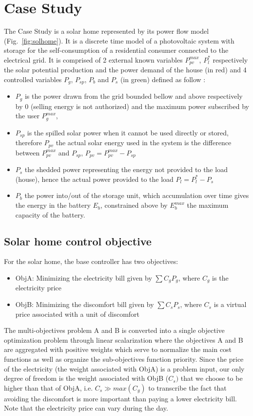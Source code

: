 \documentclass[conference]{IEEEtran}
\begin{document}
\section{Case Study}\label{CaseStudy}

\quad The Case Study is a solar home represented by its power flow model (Fig.~\ref{fig:solhome}). It is a discrete time model of a photovoltaic system with storage for the self-consumption of a residential consumer connected to the electrical grid. It is comprised of 2 external known variables $P_{pv}^{max}$, $P_l^*$ respectively the solar potential production  and the power demand of the house (in red) and 4 controlled variables $P_g$, $P_{sp}$, $P_b$ and $P_s$ (in green) defined as follow : 
\begin{itemize}
\item $P_g$ is the power drawn from the grid bounded bellow and above
respectively by 0 (selling energy is not authorized) and the maximum power subscribed by the user $P_g^{max}$,
\item $P_{sp}$ is the spilled solar power when it cannot be used directly or stored, therefore $P_{pv}$ the actual solar energy used in the system is the difference between $P_{pv}^{max}$ and $P_{sp}$, $P_{pv} = P_{pv}^{max}-P_{sp}$
\item $P_s$ the shedded power representing the energy not provided to the load (house), hence the actual power provided to the load $P_l = P_l^* - P_s$
\item $P_b$ the power into/out of the storage unit, which accumulation over time gives the energy in the battery $E_b$, constrained above by $E_b^{max}$ the maximum capacity of the battery. 
\end{itemize}
\subsection{Solar home control objective }

For the solar home, the base controller has two objectives:
\begin{itemize}
    \item ObjA: Minimizing the electricity bill given by $\sum C_gP_g$, where $C_g$ is the electricity price
    \item ObjB: Minimizing the  discomfort bill given by $\sum C_sP_s$, where $C_s$ is a virtual price associated with a unit of discomfort
\end{itemize}
The multi-objectives problem A and B is converted into a single objective optimization problem through linear scalarization \cite{Deb2014} where the objectives A and B are aggregated with positive weights which serve to normalize the main cost functions as well as organize the sub-objectives function
priority. Since the price of the electricity (the weight associated with ObjA) is a problem input, our only degree of freedom is the weight associated with ObjB ($C_s)$ that we choose to be higher than that of ObjA, i.e. $C_s \gg max(C_g)$ to transcribe the fact that avoiding the discomfort is more important than paying a lower electricity bill. Note that the electricity price can vary during the day.
\end{document}

